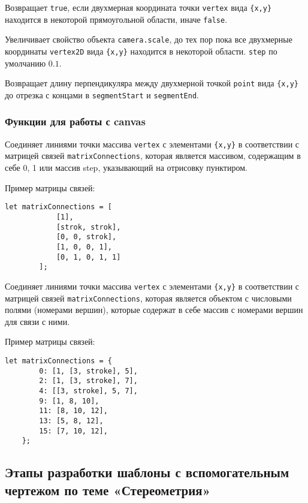 Возвращает \texttt{true}, если двухмерная координата точки \texttt{vertex} вида \texttt{\{x,y\}} находится в некоторой прямоугольной области, иначе \texttt{false}.

Увеличивает свойство объекта \texttt{camera.scale}, до тех пор пока все двухмерные координаты \texttt{vertex2D} вида \texttt{\{x,y\}}  находится в некоторой области. \texttt{step} по умолчанию $0.1$.

Возвращает длину перпендикуляра между двухмерной точкой \texttt{point} вида \texttt{\{x,y\}} до отрезка с концами в \texttt{segmentStart} и \texttt{segmentEnd}.

\subsubsection{Функции для работы с canvas}

Соединяет линиями точки массива \texttt{vertex} с элементами \texttt{\{x,y\}} в соответствии с матрицей связей \texttt{matrixConnections}, которая является массивом, содержащим в себе 0, 1 или массив step, указывающий на отрисовку пунктиром.

Пример матрицы связей:
\begin{lstlisting}[frame=none]
	let matrixConnections = [
			[1],
			[strok, strok],
			[0, 0, strok],
			[1, 0, 0, 1],
			[0, 1, 0, 1, 1]
		];
	\end{lstlisting}

Соединяет линиями точки массива \texttt{vertex} с элементами \texttt{\{x,y\}} в соответствии с матрицей связей \texttt{matrixConnections}, которая является объектом с числовыми полями (номерами вершин), которые содержат в себе массив с номерами вершин для связи с ними.

Пример матрицы связей:
\begin{lstlisting}[frame=none]
	let matrixConnections = {
		0: [1, [3, stroke], 5],
		2: [1, [3, stroke], 7],
		4: [[3, stroke], 5, 7],
		9: [1, 8, 10],
		11: [8, 10, 12],
		13: [5, 8, 12],
		15: [7, 10, 12],
	};
	\end{lstlisting}

\subsection{Этапы разработки шаблоны с вспомогательным чертежом по теме «Стереометрия»}

